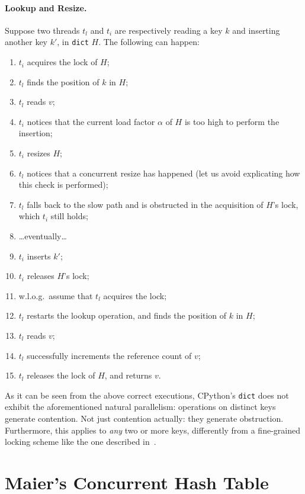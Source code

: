 \paragraph{Lookup and Resize.}
Suppose two threads $t_l$ and $t_i$ are respectively reading a key $k$ and inserting another key $k'$, in \texttt{dict} $H$.
The following can happen:
\begin{enumerate}
	\item $t_i$ acquires the lock of $H$;
	\item $t_l$ finds the position of $k$ in $H$;
	\item $t_l$ reads $v$;
	\item $t_i$ notices that the current load factor $\alpha$ of $H$ is too high to perform the insertion;
	\item $t_i$ resizes $H$;
	\item $t_l$ notices that a concurrent resize has happened (let us avoid explicating how this check is performed);
	\item $t_l$ falls back to the slow path and is obstructed in the acquisition of $H$'s lock, which $t_i$ still holds;
	\item {\ldots}eventually{\ldots}
	\item $t_i$ inserts $k'$;
	\item $t_i$ releases $H$'s lock;
	\item w.l.o.g.\ assume that $t_l$ acquires the lock;
	\item $t_l$ restarts the lookup operation, and finds the position of $k$ in $H$;
	\item $t_l$ reads $v$;
	\item $t_l$ successfully increments the reference count of $v$;
	\item $t_l$ releases the lock of $H$, and returns $v$.
\end{enumerate}

As it can be seen from the above correct executions, CPython's \texttt{dict} does not exhibit the aforementioned natural parallelism: operations on distinct keys generate contention.
Not just contention actually: they generate obstruction.
Furthermore, this applies to \emph{any} two or more keys, differently from a fine-grained locking scheme like the one described in~\cite[\S13.2.2]{art-mp}.


\section{Maier's Concurrent Hash Table}\label{sec:maier-review}


